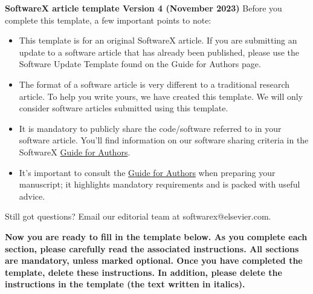 \documentclass[preprint,12pt, a4paper]{elsarticle}
\begin{document}
\renewcommand{\labelenumii}{\arabic{enumi}.\arabic{enumii}}

\begin{frontmatter}

  {\large\textbf{SoftwareX article template Version 4 (November 2023)}}
  Before you complete this template, a few important points to note:
  \begin{itemize}
\item	This template is for an original SoftwareX article. If you are submitting an update to a software article that has already been published, please use the Software Update Template found on the Guide for Authors page.
\item	The format of a software article is very different to a traditional research article. To help you write yours, we have created this template. We will only consider software articles submitted using this template.
\item	It is mandatory to publicly share the code/software referred to in your software article. You’ll find information on our software sharing criteria in the SoftwareX \href{https://www.elsevier.com/journals/softwarex/2352-7110/guide-for-authors}{Guide for Authors}.
\item	It’s important to consult the \href{https://www.elsevier.com/journals/softwarex/2352-7110/guide-for-authors}{Guide for Authors} when preparing your manuscript; it highlights mandatory requirements and is packed with useful advice.
\end{itemize}
%
Still got questions?
Email our editorial team at softwarex@elsevier.com.

\textbf{Now you are ready to fill in the template below. As you complete each section, please carefully read the associated instructions. All sections are mandatory, unless marked optional.
Once you have completed the template, delete these instructions. In addition, please delete the instructions in the template (the text written in italics).}




\end{frontmatter}
\end{document}
